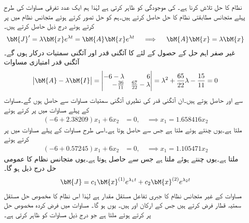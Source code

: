  نظام کا حل تلاش کرنا ہے۔ کی موجودگی   کو ظاہر کرتی ہے لہٰذا ہم ایک عدد تفرقی مساوات کی طرح پہلے متجانس مطابقتی نظام  کا حل حاصل کرتے ہیں۔ہم  کو حل تصور کرتے ہوئے متجانس نظام میں پر کرتے ہوئے درج ذیل حاصل کرتے ہیں۔
\begin{align*}
\bM{J}'=\lambda \bM{x}e^{\lambda t}=\bM{A}\bM{x}e^{\lambda t} \quad \implies \quad \bM{A}\bM{x}=\lambda \bM{x}
\end{align*}
غیر صفر اہم حل کے حصول کے لئے  کا آئگنی قدر اور آئگنی سمتیات درکار ہوں گے۔آئگنی قدر امتیازی مساوات
\begin{align*}
\abs{\bM{A}-\lambda \bM{I}}=\begin{vmatrix*}[r] -6-\lambda& 6 \\-\frac{36}{11}&\frac{67}{22}-\lambda \end{vmatrix*}=\lambda^2+\frac{65}{22}\lambda-\frac{15}{11}=0
\end{align*}
سے  اور  حاصل ہوتے ہیں۔ان آئگنی قدر کی نظیری آئگنی سمتیات مساوات  سے حاصل ہوں گے۔مساوات  کے پہلے مساوات میں   پر کرتے ہوئے 
\begin{align*}
(-6+2.38209)x_1+6x_2&=0,\quad \implies x_1=1.658416x_2
\end{align*}
ملتا ہے۔یوں  چنتے ہوئے  ملتا ہے جس سے  حاصل ہوتا ہے۔اسی طرح مساوات  کے پہلے مساوات میں   پر کرتے ہوئے 
\begin{align*}
(-6+0.57245)x_1+6x_2&=0,\quad \implies x_1=1.105471x_2
\end{align*}
ملتا ہے۔یوں  چنتے ہوئے  ملتا ہے جس سے  حاصل ہوتا ہے۔یوں متجانس نظام کا عمومی حل درج ذیل ہو گا۔
\begin{align}
\bM{J}=c_1\bM{x}^{(1)}e^{\lambda_1 t}+c_2 \bM{x}^{(2)}e^{\lambda_2 t}
\end{align}
مساوات  کے غیر متجانس نظام کا جبری تفاعل  مستقل مقدار ہے لہٰذا اس نظام کا مخصوص حل  مستقل سمتیہ قطار  فرض کرتے ہیں جس کے ارکان  اور  ہیں۔ یوں  ہو گا۔ مساوات  میں فرض کردہ مخصوص حل پر کرتے ہوئے   ملتا ہے جو درج ذیل  مساوات کو ظاہر کرتی ہے۔
